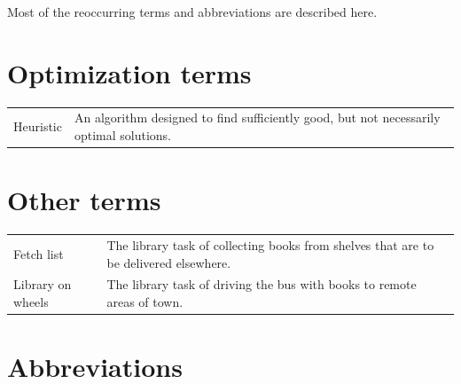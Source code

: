 \documentclass[a4paper, 10pt, twoside, openright]{book}
\begin{document}
Most of the reoccurring terms and abbreviations are described here.

\section*{Optimization terms}
\begin{tabular}{lp{10cm}}

Heuristic & An algorithm designed to find sufficiently good, but not necessarily optimal solutions. \\

\end{tabular}

\section*{Other terms}
\begin{tabular}{lp{10cm}}

Fetch list & The library task of collecting books from shelves that are to be delivered elsewhere. \\
Library on wheels & The library task of driving the bus with books to remote areas of town. \\
\end{tabular}


\section*{Abbreviations}
\end{document}
